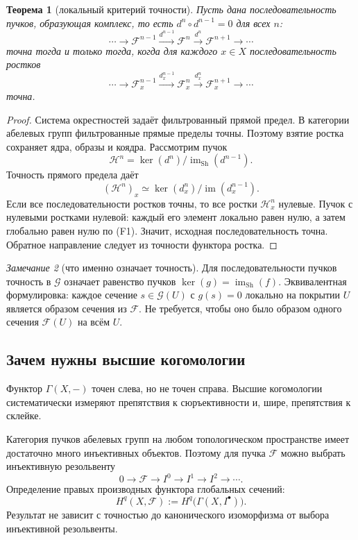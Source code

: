 \documentclass[11pt,b5paper,oneside]{article}
\newcommand{\F}{\mathscr F}
\newcommand{\G}{\mathscr G}
\newcommand{\Sh}{\mathrm{Sh}}
\theoremstyle{plain}
\newtheorem{thm}{Теорема}[section]
\theoremstyle{definition}
\theoremstyle{remark}
\newtheorem{rem}[thm]{Замечание}
\begin{document}
\begin{thm}[локальный критерий точности]
Пусть дана последовательность пучков, образующая комплекс, то есть
$d^n\circ d^{n-1}=0$ для всех $n$:
\[
  \cdots\longrightarrow\F^{n-1}\xrightarrow{d^{n-1}}\F^n
  \xrightarrow{d^n}\F^{n+1}\longrightarrow\cdots
\]
точна тогда и только тогда, когда для каждого $x\in X$ последовательность
ростков
\[
  \cdots\longrightarrow\F^{n-1}_x\xrightarrow{d^{n-1}_x}\F^n_x
  \xrightarrow{d^n_x}\F^{n+1}_x\longrightarrow\cdots
\]
точна.
\end{thm}
\begin{proof}
Система окрестностей задаёт фильтрованный прямой предел.
В категории абелевых групп фильтрованные прямые пределы точны.
Поэтому взятие ростка сохраняет ядра, образы и коядра. Рассмотрим пучок
\[
  \mathscr H^n=\ker(d^n)/\operatorname{im}_{\Sh}(d^{n-1}).
\]
Точность прямого предела даёт
\[
  (\mathscr H^n)_x\simeq
  \ker(d^n_x)/\operatorname{im}(d^{n-1}_x).
\]
Если все последовательности
ростков точны, то все ростки $\mathscr H^n_x$ нулевые. Пучок с нулевыми
ростками нулевой: каждый его элемент локально равен нулю, а затем
глобально равен нулю по (F1). Значит, исходная последовательность точна.
Обратное направление следует из точности функтора ростка.
\end{proof}

\begin{rem}[что именно означает точность]
Для последовательности пучков точность в $\G$ означает равенство
пучков $\ker(g)=\operatorname{im}_{\Sh}(f)$. Эквивалентная формулировка:
каждое сечение $s\in\G(U)$ с $g(s)=0$ локально на покрытии $U$ является
образом сечения из $\F$. Не требуется, чтобы оно было образом одного
сечения $\F(U)$ на всём $U$.
\end{rem}

\subsection{Зачем нужны высшие когомологии}
Функтор $\Gamma(X,-)$ точен слева, но не точен справа. Высшие
когомологии систематически измеряют препятствия к сюръективности и,
шире, препятствия к склейке.

Категория пучков абелевых групп на любом топологическом пространстве
имеет достаточно много инъективных объектов. Поэтому для пучка $\F$
можно выбрать инъективную резольвенту
\[
  0\longrightarrow\F\longrightarrow I^0\longrightarrow I^1
  \longrightarrow I^2\longrightarrow\cdots.
\]
Определение правых производных функтора глобальных сечений:
\[
  H^q(X,\F):=H^q\bigl(\Gamma(X,I^\bullet)\bigr).
\]
Результат не зависит с точностью до канонического изоморфизма от выбора
инъективной резольвенты.
\end{document}
